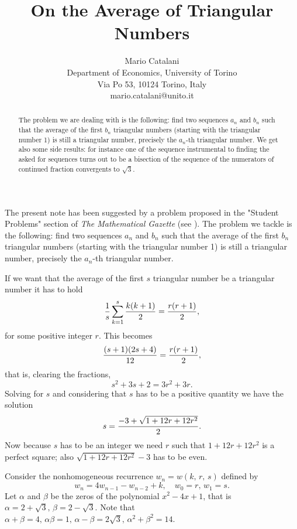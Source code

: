 
\def\b#1{{\bf #1}}
\def\i#1{{\it #1}}




\title{On the Average of Triangular Numbers}
\author{Mario Catalani\\
Department of Economics, University of Torino\\
Via Po 53, 10124 Torino, Italy\\
mario.catalani@unito.it}
\date{}
\maketitle
\begin{abstract}
The problem we are dealing with is the following: find two sequences
$a_n$ and $b_n$
such that the average of the first $b_n$ triangular numbers (starting with
the triangular number 1) is still a triangular number, precisely
the $a_n$-th triangular number. We get also some side
results: for instance one of the sequence instrumental to finding
the asked for sequences turns out to be a bisection of
the sequence of the numerators
of continued fraction convergents to $\sqrt{3}$.
\end{abstract}

\bigskip
\bigskip
\bigskip

\noindent
The present note has been suggested by a problem proposed in the "Student
Problems" section of \i{The Mathematical Gazette} (see \cite{studentproblem}).
The problem we tackle is the following: find two sequences $a_n$ and $b_n$
such that the average of the first $b_n$ triangular numbers (starting with
the triangular number 1) is still a triangular number, precisely
the $a_n$-th triangular number.

\noindent
If we want that the average of the first $s$ triangular number be a
triangular number it has to hold
$${1\over s}\sum_{k=1}^s{k(k+1)\over 2}={r(r+1)\over 2},$$
for some positive integer $r$. This becomes
$${(s+1)(2s+4)\over 12}={r(r+1)\over 2},$$ that is, clearing the
fractions,
\begin{equation}
\label{eq:equazione}
s^2+3s+2=3r^2+3r.
\end{equation}
Solving for $s$ and considering that $s$ has to be a positive quantity
we have the solution
$$s={-3+\sqrt{1+12r+12r^2}\over 2}.$$
Now because $s$ has to be an integer we need $r$ such that $1+12r+12r^2$
is a perfect square; also $\sqrt{1+12r+12r^2}-3$ has to be even.

\noindent
Consider the nonhomogeneous recurrence
$w_n=w(k,\,r,\,s)$ defined by
$$w_n=4w_{n-1}-w_{n-2}+k,\quad w_0=r,\,w_1=s.$$
Let $\alpha$ and $\beta$ be the zeros of the polynomial $x^2-4x+1$,
that is $\alpha=2+\sqrt{3},\,\beta=2-\sqrt{3}$. Note that $\alpha+\beta=4,\,
\alpha\beta=1,\,\alpha-\beta=2\sqrt{3},\,\alpha^2+\beta^2=14$.

